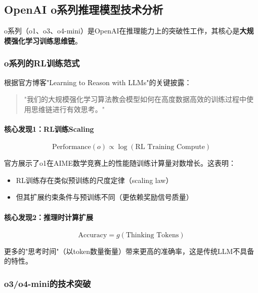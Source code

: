 \documentclass[12pt,a4paper]{article}
\begin{document}
\subsection{OpenAI o系列推理模型技术分析}

o系列（o1、o3、o4-mini）是OpenAI在推理能力上的突破性工作，其核心是\textbf{大规模强化学习训练思维链}。

\subsubsection{o系列的RL训练范式}

根据官方博客"Learning to Reason with LLMs"的关键披露：

\begin{quote}
"我们的大规模强化学习算法教会模型如何在高度数据高效的训练过程中使用思维链进行有效思考。"
\end{quote}

\paragraph{核心发现1：RL训练Scaling}

\begin{equation}
\text{Performance}(o) \propto \log(\text{RL Training Compute})
\end{equation}

官方展示了o1在AIME数学竞赛上的性能随训练计算量对数增长。这表明：
\begin{itemize}
    \item RL训练存在类似预训练的尺度定律（scaling law）
    \item 但其扩展约束条件与预训练不同（更依赖奖励信号质量）
\end{itemize}

\paragraph{核心发现2：推理时计算扩展}

\begin{equation}
\text{Accuracy} = g(\text{Thinking Tokens})
\end{equation}

更多的"思考时间"（以token数量衡量）带来更高的准确率，这是传统LLM不具备的特性。

\subsubsection{o3/o4-mini的技术突破}
\end{document}
